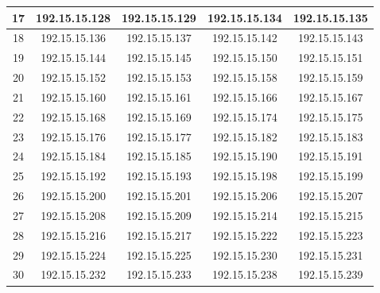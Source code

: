 \documentclass[letterpaper,12pt]{article}
\begin{document}
\begin{longtable}{|c|c|c|c|c|}
        17 & 192.15.15.128 & 192.15.15.129 & 192.15.15.134 & 192.15.15.135 \\ \hline
        18 & 192.15.15.136 & 192.15.15.137 & 192.15.15.142 & 192.15.15.143 \\ \hline
        19 & 192.15.15.144 & 192.15.15.145 & 192.15.15.150 & 192.15.15.151 \\ \hline
        20 & 192.15.15.152 & 192.15.15.153 & 192.15.15.158 & 192.15.15.159 \\ \hline
        21 & 192.15.15.160 & 192.15.15.161 & 192.15.15.166 & 192.15.15.167 \\ \hline
        22 & 192.15.15.168 & 192.15.15.169 & 192.15.15.174 & 192.15.15.175 \\ \hline
        23 & 192.15.15.176 & 192.15.15.177 & 192.15.15.182 & 192.15.15.183 \\ \hline
        24 & 192.15.15.184 & 192.15.15.185 & 192.15.15.190 & 192.15.15.191 \\ \hline
        25 & 192.15.15.192 & 192.15.15.193 & 192.15.15.198 & 192.15.15.199 \\ \hline
        26 & 192.15.15.200 & 192.15.15.201 & 192.15.15.206 & 192.15.15.207 \\ \hline
        27 & 192.15.15.208 & 192.15.15.209 & 192.15.15.214 & 192.15.15.215 \\ \hline
        28 & 192.15.15.216 & 192.15.15.217 & 192.15.15.222 & 192.15.15.223 \\ \hline
        29 & 192.15.15.224 & 192.15.15.225 & 192.15.15.230 & 192.15.15.231 \\ \hline
        30 & 192.15.15.232 & 192.15.15.233 & 192.15.15.238 & 192.15.15.239 \\ \hline
    \end{longtable}
\end{document}
